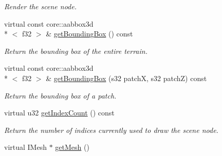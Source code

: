\begin{DoxyCompactItemize}
\begin{DoxyCompactList}\small\item\em Render the scene node. \end{DoxyCompactList}\item 
\hypertarget{classirr_1_1scene_1_1_c_terrain_scene_node_a1338c7c5102594673fc837f7554bd79a}{virtual const core\-::aabbox3d\\*
$<$ f32 $>$ \& \hyperlink{classirr_1_1scene_1_1_c_terrain_scene_node_a1338c7c5102594673fc837f7554bd79a}{get\-Bounding\-Box} () const }\label{classirr_1_1scene_1_1_c_terrain_scene_node_a1338c7c5102594673fc837f7554bd79a}

\begin{DoxyCompactList}\small\item\em Return the bounding box of the entire terrain. \end{DoxyCompactList}\item 
\hypertarget{classirr_1_1scene_1_1_c_terrain_scene_node_a16df767d60ef3979421d854938feef42}{virtual const core\-::aabbox3d\\*
$<$ f32 $>$ \& \hyperlink{classirr_1_1scene_1_1_c_terrain_scene_node_a16df767d60ef3979421d854938feef42}{get\-Bounding\-Box} (s32 patch\-X, s32 patch\-Z) const }\label{classirr_1_1scene_1_1_c_terrain_scene_node_a16df767d60ef3979421d854938feef42}

\begin{DoxyCompactList}\small\item\em Return the bounding box of a patch. \end{DoxyCompactList}\item 
\hypertarget{classirr_1_1scene_1_1_c_terrain_scene_node_af89a205b4f80037970c260f1f90885b7}{virtual u32 \hyperlink{classirr_1_1scene_1_1_c_terrain_scene_node_af89a205b4f80037970c260f1f90885b7}{get\-Index\-Count} () const }\label{classirr_1_1scene_1_1_c_terrain_scene_node_af89a205b4f80037970c260f1f90885b7}

\begin{DoxyCompactList}\small\item\em Return the number of indices currently used to draw the scene node. \end{DoxyCompactList}\item 
\hypertarget{classirr_1_1scene_1_1_c_terrain_scene_node_a99c9c429ca8ede2921d58dde1686094a}{virtual I\-Mesh $\ast$ \hyperlink{classirr_1_1scene_1_1_c_terrain_scene_node_a99c9c429ca8ede2921d58dde1686094a}{get\-Mesh} ()}\label{classirr_1_1scene_1_1_c_terrain_scene_node_a99c9c429ca8ede2921d58dde1686094a}


\end{DoxyCompactItemize}
